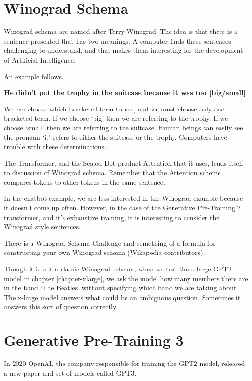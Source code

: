 \section{Winograd Schema}

Winograd schema are named after Terry Winograd. The idea is that there is a sentence presented that has two meanings. A computer finds these sentences challenging to understand, and that makes them interesting for the development of Artificial Intelligence.

An example follows.

\begin{center}
	\textbf{He didn't put the trophy in the suitcase because it was too [big/small]}
\end{center}

We can choose which bracketed term to use, and we must choose only one bracketed term. If we choose `big' then we are referring to the trophy. If we choose `small' then we are referring to the suitcase. Human beings can easily see the pronoun `it' refers to either the suitcase or the trophy. Computers have trouble with these determinations.

The Transformer, and the Scaled Dot-product Attention that it uses, lends itself to discussion of Winograd schema. Remember that the Attention scheme compares tokens to other tokens in the same sentence. 

In the chatbot example, we are less interested in the Winograd example because it doesn't come up often. However, in the case of the Generative Pre-Training 2 transformer, and it's exhaustive training, it is interesting to consider the Winograd style sentences.

There is a Winograd Schema Challenge and something of a formula for constructing your own Winograd schema (Wikapedia contributors). \cite{wiki:xxx}

Though it is not a classic Winograd schema, when we test the x-large GPT2 model in chapter \ref{chapter-xlarge}, we ask the model how many members there are in the band `The Beatles' without specifying which band we are talking about. The x-large model answers what could be an ambiguous question. Sometimes it answers this sort of question correctly.

\section{Generative Pre-Training 3}

In 2020 OpenAI, the company responsible for training the GPT2 model, released a new paper and set of models called GPT3.

